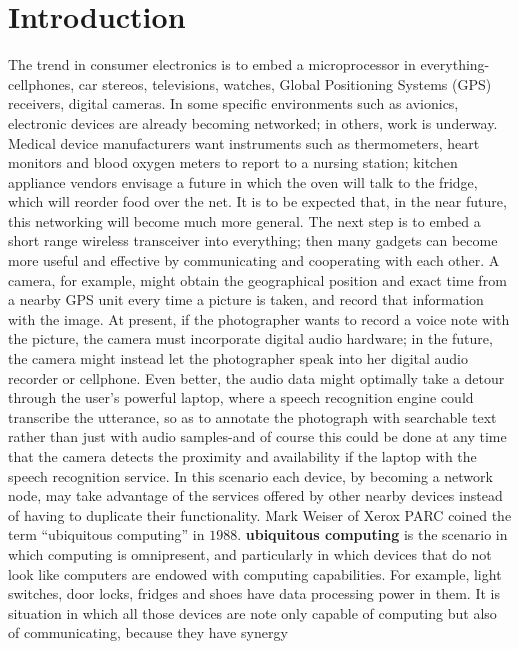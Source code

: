 \chapter{Introduction} %
\label{cha:introduction}
	
	The trend in consumer electronics is to embed a microprocessor in everything-cellphones, car stereos,  televisions, watches, Global Positioning Systems (GPS) receivers, digital cameras.
	In some specific environments such as avionics, electronic devices are already becoming networked; in others, work is underway.
	Medical device manufacturers want instruments such as thermometers, heart monitors and blood oxygen meters to report to a nursing station; kitchen appliance vendors envisage a future in which the oven will talk to the fridge, which will reorder food over the net. 
	It is to be expected that, in the near future, this networking will become much more general.
	The next step is to embed a short range wireless transceiver into everything; then many gadgets can become more useful and effective by communicating and cooperating with each other.
	A camera, for example, might obtain the geographical position and exact time from a nearby GPS unit every time a picture is taken, and record that information with the image.
	At present, if the photographer wants to record a voice note with the picture, the camera must incorporate digital audio hardware; in the future, the camera might instead let the photographer speak into her digital audio recorder or cellphone.
	Even better, the audio data might optimally take a detour through the user's powerful laptop, where a speech recognition engine could transcribe the utterance, so as to annotate the photograph with searchable text rather than just with audio samples-and of course this could be done at any time that the camera detects the proximity and availability if the laptop with the speech recognition service.
	In this scenario each device, by becoming a network node, may take advantage of the services offered by other nearby devices instead of having to duplicate their functionality.
	Mark Weiser of Xerox PARC \cite{weiser1991computer} coined the term ``ubiquitous computing'' in $1988$. 
	\textbf{ubiquitous computing} is the scenario in which computing is omnipresent, and particularly in which devices that do not look like computers are endowed with computing capabilities.
	For example, light switches, door locks, fridges and shoes have data processing power in them.
	It is situation in which all those devices are note only capable of computing but also of communicating, because they have synergy
